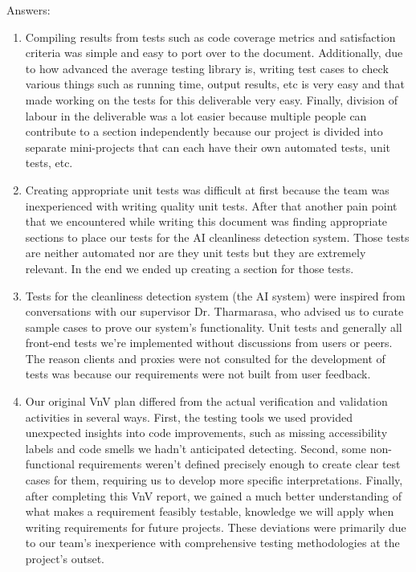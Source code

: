 \documentclass[12pt, titlepage]{article}
\begin{document}
Answers:
\begin{enumerate}
  \item Compiling results from tests such as code coverage metrics and satisfaction criteria was simple and easy to port over to the document. Additionally, due to how advanced the average testing library is, writing test cases to check various things such as running time, output results, etc is very easy and that made working on the tests for this deliverable very easy. Finally, division of labour in the deliverable was a lot easier because multiple people can contribute to a section independently because our project is divided into separate mini-projects that can each have their own automated tests, unit tests, etc.
  \item Creating appropriate unit tests was difficult at first because the team was inexperienced with writing quality unit tests. After that another pain point that we encountered while writing this document was finding appropriate sections to place our tests for the AI cleanliness detection system. Those tests are neither automated nor are they unit tests but they are extremely relevant. In the end we ended up creating a section for those tests.
  \item Tests for the cleanliness detection system (the AI system) were inspired from conversations with our supervisor Dr. Tharmarasa, who advised us to curate sample cases to prove our system's functionality. Unit tests and generally all front-end tests we're implemented without discussions from users or peers. The reason clients and proxies were not consulted for the development of tests was because our requirements were not built from user feedback.
  \item Our original VnV plan differed from the actual verification and validation activities in several ways. First, the testing tools we used provided unexpected insights into code improvements, such as missing accessibility labels and code smells we hadn't anticipated detecting. Second, some non-functional requirements weren't defined precisely enough to create clear test cases for them, requiring us to develop more specific interpretations. Finally, after completing this VnV report, we gained a much better understanding of what makes a requirement feasibly testable, knowledge we will apply when writing requirements for future projects. These deviations were primarily due to our team's inexperience with comprehensive testing methodologies at the project's outset.
\end{enumerate}
\end{document}
